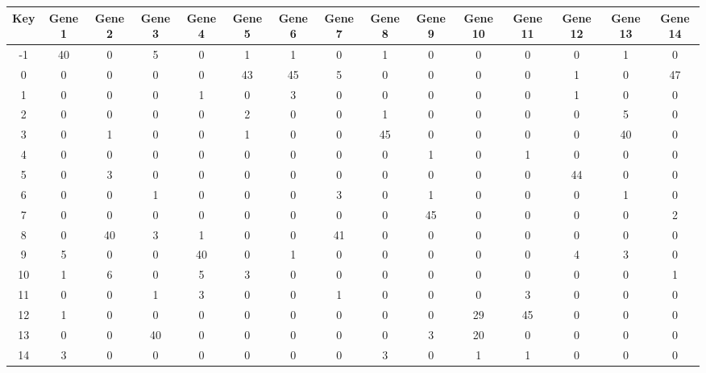 \begin{tabular}{|c|c|c|c|c|c|c|c|c|c|c|c|c|c|c|}
\hline
Key & Gene 1 & Gene 2 & Gene 3 & Gene 4 & Gene 5 & Gene 6 & Gene 7 & Gene 8 & Gene 9 & Gene 10 & Gene 11 & Gene 12 & Gene 13 & Gene 14 \\
\hline
-1 & 40 & 0 & 5 & 0 & 1 & 1 & 0 & 1 & 0 & 0 & 0 & 0 & 1 & 0 \\
0 & 0 & 0 & 0 & 0 & 43 & 45 & 5 & 0 & 0 & 0 & 0 & 1 & 0 & 47 \\
1 & 0 & 0 & 0 & 1 & 0 & 3 & 0 & 0 & 0 & 0 & 0 & 1 & 0 & 0 \\
2 & 0 & 0 & 0 & 0 & 2 & 0 & 0 & 1 & 0 & 0 & 0 & 0 & 5 & 0 \\
3 & 0 & 1 & 0 & 0 & 1 & 0 & 0 & 45 & 0 & 0 & 0 & 0 & 40 & 0 \\
4 & 0 & 0 & 0 & 0 & 0 & 0 & 0 & 0 & 1 & 0 & 1 & 0 & 0 & 0 \\
5 & 0 & 3 & 0 & 0 & 0 & 0 & 0 & 0 & 0 & 0 & 0 & 44 & 0 & 0 \\
6 & 0 & 0 & 1 & 0 & 0 & 0 & 3 & 0 & 1 & 0 & 0 & 0 & 1 & 0 \\
7 & 0 & 0 & 0 & 0 & 0 & 0 & 0 & 0 & 45 & 0 & 0 & 0 & 0 & 2 \\
8 & 0 & 40 & 3 & 1 & 0 & 0 & 41 & 0 & 0 & 0 & 0 & 0 & 0 & 0 \\
9 & 5 & 0 & 0 & 40 & 0 & 1 & 0 & 0 & 0 & 0 & 0 & 4 & 3 & 0 \\
10 & 1 & 6 & 0 & 5 & 3 & 0 & 0 & 0 & 0 & 0 & 0 & 0 & 0 & 1 \\
11 & 0 & 0 & 1 & 3 & 0 & 0 & 1 & 0 & 0 & 0 & 3 & 0 & 0 & 0 \\
12 & 1 & 0 & 0 & 0 & 0 & 0 & 0 & 0 & 0 & 29 & 45 & 0 & 0 & 0 \\
13 & 0 & 0 & 40 & 0 & 0 & 0 & 0 & 0 & 3 & 20 & 0 & 0 & 0 & 0 \\
14 & 3 & 0 & 0 & 0 & 0 & 0 & 0 & 3 & 0 & 1 & 1 & 0 & 0 & 0 \\
\hline
\end{tabular}